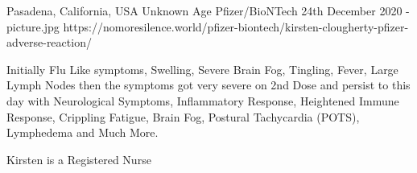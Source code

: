 {Pasadena, California, USA}
{Unknown Age}
{Pfizer/BioNTech}
{24th December 2020}
{-}
{picture.jpg}
{https://nomoresilence.world/pfizer-biontech/kirsten-clougherty-pfizer-adverse-reaction/}
{


Initially Flu Like symptoms, Swelling, Severe Brain Fog, Tingling, Fever, Large Lymph Nodes then the symptoms got very severe on 2nd Dose and persist to this day with Neurological Symptoms, Inflammatory Response, Heightened Immune Response, Crippling Fatigue, Brain Fog, Postural Tachycardia (POTS), Lymphedema and Much More.

Kirsten is a Registered Nurse

}
